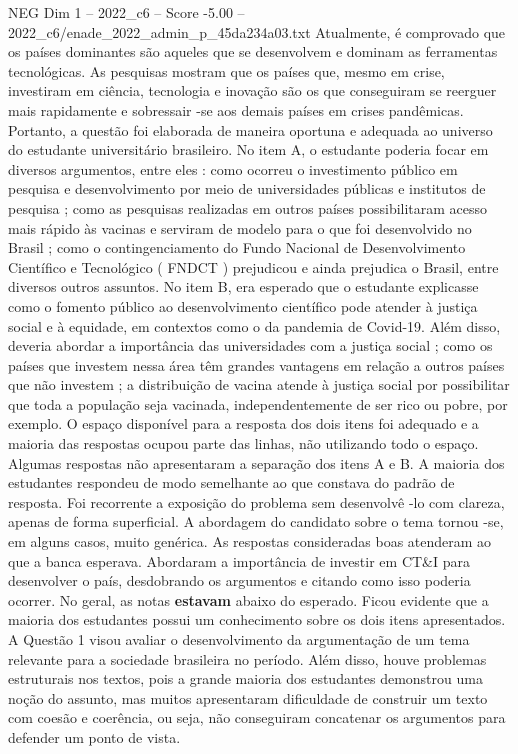 \begin{textsample}{NEG Dim 1 – 2022\_c6 – Score -5.00 – 2022\_c6/enade\_2022\_admin\_p\_45da234a03.txt}
Atualmente, é comprovado que os países dominantes são aqueles que se desenvolvem e dominam as ferramentas tecnológicas.
As pesquisas mostram que os países que, mesmo em crise, investiram em ciência, tecnologia e inovação são os que conseguiram se reerguer mais rapidamente e sobressair -se aos demais países em crises pandêmicas.
Portanto, a questão foi elaborada de maneira oportuna e adequada ao universo do estudante universitário brasileiro.
No item A, o estudante poderia focar em diversos argumentos, entre eles : como ocorreu o investimento público em pesquisa e desenvolvimento por meio de universidades públicas e institutos de pesquisa ; como as pesquisas realizadas em outros países possibilitaram acesso mais rápido às vacinas e serviram de modelo para o que foi desenvolvido no Brasil ; como o contingenciamento do Fundo Nacional de Desenvolvimento Científico e Tecnológico ( FNDCT ) prejudicou e ainda prejudica o Brasil, entre diversos outros assuntos.
No item B, era esperado que o estudante explicasse como o fomento público ao desenvolvimento científico pode atender à justiça social e à equidade, em contextos como o da pandemia de Covid-19.
Além disso, deveria abordar a importância das universidades com a justiça social ; como os países que investem nessa área têm grandes vantagens em relação a outros países que não investem ; a distribuição de vacina atende à justiça social por possibilitar que toda a população seja vacinada, independentemente de ser rico ou pobre, por exemplo.
O espaço disponível para a resposta dos dois itens foi adequado e a maioria das respostas ocupou parte das linhas, não utilizando todo o espaço.
Algumas respostas não apresentaram a separação dos itens A e B.
A maioria dos estudantes respondeu de modo semelhante ao que constava do padrão de resposta.
Foi recorrente a exposição do problema sem desenvolvê -lo com clareza, apenas de forma superficial.
A abordagem do candidato sobre o tema tornou -se, em alguns casos, muito genérica.
As respostas consideradas boas atenderam ao que a banca esperava.
Abordaram a importância de investir em CT\&I para desenvolver o país, desdobrando os argumentos e citando como isso poderia ocorrer.
No geral, as notas \textbf{estavam} abaixo do esperado.
Ficou evidente que a maioria dos estudantes possui um conhecimento sobre os dois itens apresentados.
A Questão 1 visou avaliar o desenvolvimento da argumentação de um tema relevante para a sociedade brasileira no período.
Além disso, houve problemas estruturais nos textos, pois a grande maioria dos estudantes demonstrou uma noção do assunto, mas muitos apresentaram dificuldade de construir um texto com coesão e coerência, ou seja, não conseguiram concatenar os argumentos para defender um ponto de vista.

\end{textsample}
